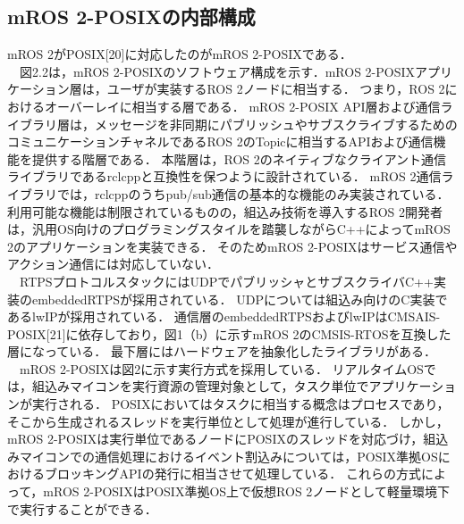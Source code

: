 \subsection{mROS 2-POSIXの内部構成}
mROS 2がPOSIX[20]に対応したのがmROS 2-POSIXである．
\\　図2.2は，mROS 2-POSIXのソフトウェア構成を示す．mROS 2-POSIXアプリケーション層は，ユーザが実装するROS 2ノードに相当する．
つまり，ROS 2におけるオーバーレイに相当する層である．
mROS 2-POSIX API層および通信ライブラリ層は，メッセージを非同期にパブリッシュやサブスクライブするためのコミュニケーションチャネルであるROS 2のTopicに相当するAPIおよび通信機能を提供する階層である．
本階層は，ROS 2のネイティブなクライアント通信ライブラリであるrclcppと互換性を保つように設計されている．
mROS 2通信ライブラリでは，rclcppのうちpub/sub通信の基本的な機能のみ実装されている．
利用可能な機能は制限されているものの，組込み技術を導入するROS 2開発者は，汎用OS向けのプログラミングスタイルを踏襲しながらC++によってmROS 2のアプリケーションを実装できる．
そのためmROS 2-POSIXはサービス通信やアクション通信には対応していない．
\\　RTPSプロトコルスタックにはUDPでパブリッシャとサブスクライバC++実装のembeddedRTPSが採用されている．
UDPについては組込み向けのC実装であるlwIPが採用されている．
通信層のembeddedRTPSおよびlwIPはCMSAIS-POSIX[21]に依存しており，図1（b）に示すmROS 2のCMSIS-RTOSを互換した層になっている．
最下層にはハードウェアを抽象化したライブラリがある．
\\　mROS 2-POSIXは図2に示す実行方式を採用している．
リアルタイムOSでは，組込みマイコンを実行資源の管理対象として，タスク単位でアプリケーションが実行される．
POSIXにおいてはタスクに相当する概念はプロセスであり，そこから生成されるスレッドを実行単位として処理が進行している．
しかし，mROS 2-POSIXは実行単位であるノードにPOSIXのスレッドを対応づけ，組込みマイコンでの通信処理におけるイベント割込みについては，POSIX準拠OSにおけるブロッキングAPIの発行に相当させて処理している．
これらの方式によって，mROS 2-POSIXはPOSIX準拠OS上で仮想ROS 2ノードとして軽量環境下で実行することができる．
